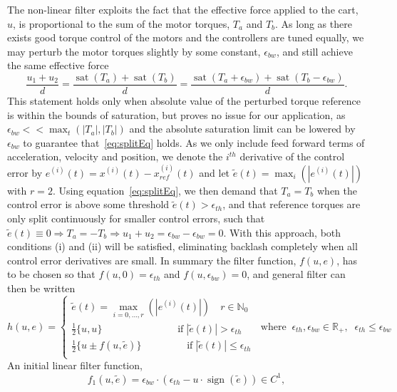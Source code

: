 \documentclass{article}
\DeclareMathOperator{\sign}{sign}
\DeclareMathOperator{\sat}{sat}
\begin{document}
The non-linear filter exploits the fact that the effective force applied to the cart, $u$, is proportional to the sum of the motor torques, $T_a$ and $T_b$. As long as there exists good torque control of the motors and the controllers are tuned equally, we may perturb the motor torques slightly by some constant, $\epsilon_{bw}$, and still achieve the same effective force
\begin{equation}\label{eq:splitEq}
\frac{u_1 + u_2}{d}  = \frac{\sat(T_a) + \sat(T_b)}{d} = \frac{\sat(T_a +  \epsilon_{bw}) + \sat(T_b - \epsilon_{bw})}{d}.
\end{equation}
This statement holds only when absolute value of the perturbed torque reference is within the bounds of saturation, but proves no issue for our application, as $\epsilon_{bw} << \max_t(|T_a|,|T_b|)$ and the absolute saturation limit can be lowered by $\epsilon_{bw}$ to guarantee that~\eqref{eq:splitEq} holds. As we only include feed forward terms of acceleration, velocity and position, we denote the $i^{th}$ derivative of the control error by $e^{(i)}(t) = x^{(i)}(t)  - x^{(i)}_{ref}(t)$ and let $\tilde{e}(t) = \max_i(|e^{(i)}(t)|)$ with $r = 2$. Using equation~\eqref{eq:splitEq}, we then demand that $T_a = T_b$ when the control error is above some threshold $\tilde{e}(t) > \epsilon_{th}$, and that reference torques are only split continuously for smaller control errors, such that $\tilde{e}(t) \equiv 0\Rightarrow T_a = -T_b \Rightarrow u_1 + u_2 = \epsilon_{bw}-\epsilon_{bw} = 0$. With this approach, both conditions (i) and (ii) will be satisfied, eliminating backlash completely when all control error derivatives are small. In summary the filter function, $f(u,e)$, has to be chosen so that $f(u,0) = \epsilon_{th}$ and $f(u,\epsilon_{bw}) = 0$, and general filter can then be written
\begin{equation}
h(u,e) = 
\begin{cases}
\tilde{e}(t) = \max\limits_{i = 0,...,r}(|e^{(i)}(t)|) \quad r\in\mathbb{N}_0\\
\frac{1}{2}\{u, u\} \qquad\qquad\qquad\quad\;\; \text{if}\; |\tilde{e}(t)| > \epsilon_{th}\\
\frac{1}{2}\{u \pm f(u,\tilde{e})\} \qquad\quad\quad\;\;\text{if}\; |\tilde{e}(t)| \leq \epsilon_{th}\\
\end{cases}
\;\;\text{where}\;\;\epsilon_{th},\epsilon_{bw}\in \mathbb{R}_+,\;\; \epsilon_{th}\leq\epsilon_{bw}
\end{equation}
An initial linear filter function,
\begin{equation}
f_1(u,\tilde{e}) = \epsilon_{bw} \cdot (\epsilon_{th}  - u \cdot \sign(\tilde{e})) \in C^1,
\end{equation}
\end{document}

